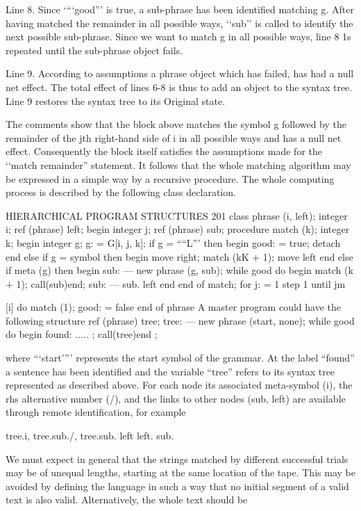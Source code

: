 {{{{	Line 8. Since ‘“‘good”’ is true, a sub-phrase has been identified matching g. After having matched the remainder in all possible ways, ‘‘sub’’ is called to identify the next possible sub-phrase. Since we want to match g in all possible ways, line 8 1s repeated until the sub-phrase object fails.
	
	Line 9. According to assumptions a phrase object which has failed, has had a null net effect. The total effect of lines 6-8 is thus to add an object to the syntax tree. Line 9 restores the syntax tree to its Original state.
	
	The comments show that the block above matches the symbol g followed by the remainder of the jth right-hand side of i in all possible ways and has a null net effect. Consequently the block itself satisfies the assumptions made for the ‘‘match remainder” statement. It follows that the whole matching algorithm may be expressed in a simple way by a recursive procedure. The whole computing process is described by the following class declaration.
	
	HIERARCHICAL PROGRAM STRUCTURES 201 class phrase (i, left); integer i; ref (phrase) left; begin integer j; ref (phrase) sub; procedure match (k); integer k; begin integer g; g: = G[i, j, k]; if g = ““L”’ then begin good: = true; detach end else if g = symbol then begin move right; match (kK + 1); move left end else if meta (g) then begin sub: — new phrase (g, sub); while good do begin match (k + 1); call(sub)end; sub: — sub. left end end of match; for j: = 1 step 1 until jm{[i] do match (1); good: = false end of phrase A master program could have the following structure ref (phrase) tree; tree: — new phrase (start, none); while good do begin found: ..... ; call(tree)end ;
		
		where “‘start’”’ represents the start symbol of the grammar. At the label “found” a sentence has been identified and the variable “tree” refers to its syntax tree represented as described above. For each node its associated meta-symbol (i), the rhs alternative number (/), and the links to other nodes (sub, left) are available through remote identification, for example
		
		tree.i, tree.sub./, tree.sub. left left. sub.
		
		We must expect in general that the strings matched by different successful trials may be of unequal lengths, starting at the same location of the tape. This may be avoided by defining the language in such a way that no initial segment of a valid text is also valid. Alternatively, the whole text should be
		
}}}}}
